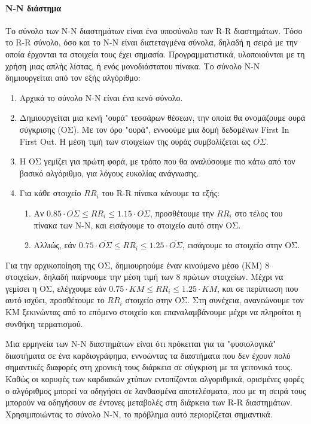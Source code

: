 \paragraph{Ν-Ν διάστημα}
Το σύνολο των Ν-Ν διαστημάτων είναι ένα υποσύνολο των R-R διαστημάτων. Τόσο το R-R σύνολο, όσο και το Ν-Ν είναι διατεταγμένα σύνολα, δηλαδή η σειρά με την οποία έρχονται τα στοιχεία τους έχει σημασία. Προγραμματιστικά, υλοποιούνται με τη χρήση μιας απλής λίστας, ή ενός μονοδιάστατου πίνακα. Το σύνολο Ν-Ν δημιουργείται από τον εξής αλγόριθμο:
\begin{enumerate}
    \item Αρχικά το σύνολο Ν-Ν είναι ένα κενό σύνολο.
    \item Δημιουργείται μια κενή "ουρά" τεσσάρων θέσεων, την οποία θα ονομάζουμε ουρά σύγκρισης (ΟΣ). Με τον όρο "ουρά", εννοούμε μια δομή δεδομένων First In First Out. Η μέση τιμή των στοιχείων της ουράς συμβολίζεται ως $\overline{O\Sigma}$.
    \item Η ΟΣ γεμίζει για πρώτη φορά, με τρόπο που θα αναλύσουμε πιο κάτω από τον βασικό αλγόριθμο, για λόγους ευκολίας ανάγνωσης.
    \item Για κάθε στοιχείο $RR_i$ του R-R πίνακα κάνουμε τα εξής:
    \begin{enumerate}
        \item Αν $ 0.85 \cdot \overline{O\Sigma} \le RR_i \le 1.15 \cdot \overline{O\Sigma} $, προσθέτουμε την $RR_i$ στο τέλος του πίνακα των Ν-Ν, και εισάγουμε το στοιχείο αυτό στην ΟΣ.
        \item Αλλιώς, εάν $ 0.75 \cdot \overline{O\Sigma} \le RR_i \le 1.25 \cdot \overline{O\Sigma} $, εισάγουμε το στοιχείο στην ΟΣ.
    \end{enumerate}
\end{enumerate}
Για την αρχικοποίηση της ΟΣ, δημιουρηούμε έναν κινούμενο μέσο (ΚΜ) 8 στοιχείων, δηλαδή παίρνουμε την μέση τιμή των 8 πρώτων στοιχείων. Μέχρι να γεμίσει η ΟΣ, ελέγχουμε εάν $ 0.75 \cdot KM \le RR_i \le 1.25 \cdot KM $, και σε περίπτωση που αυτό ισχύει, προσθέτουμε το $RR_i$ στοιχείο στην ΟΣ. Στη συνέχεια, ανανεώνουμε τον ΚΜ ξεκινώντας από το επόμενο στοιχείο και επαναλαμβάνουμε μέχρι να πληροίται η συνθήκη τερματισμού.

Μια ερμηνεία των Ν-Ν διαστημάτων είναι ότι πρόκειται για τα "φυσιολογικά" διαστήματα σε ένα καρδιογράφημα, εννοώντας τα διαστήματα που δεν έχουν πολύ σημαντικές διαφορές στη χρονική τους διάρκεια σε σύγκριση με τα γειτονικά τους. Καθώς οι κορυφές των καρδιακών χτύπων εντοπίζονται αλγοριθμικά, ορισμένες φορές ο αλγόριθμος μπορεί να οδηγήσει σε λανθασμένα αποτελέσματα, που με τη σειρά τους μπορούν να οδηγήσουν σε έντονες μεταβολές στη διάρκεια των R-R διαστημάτων. Χρησιμποιώντας το σύνολο Ν-Ν, το πρόβλημα αυτό περιορίζεται σημαντικά.

